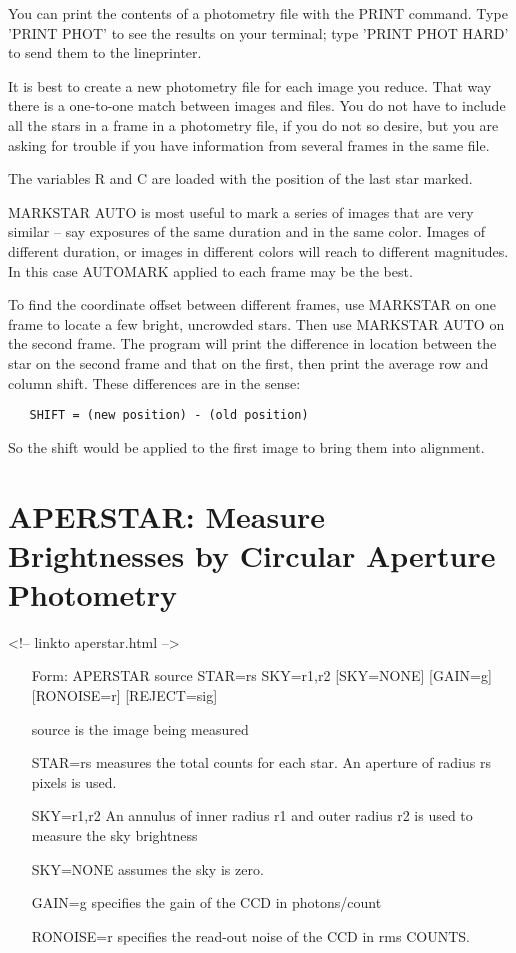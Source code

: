 You can print the contents of a photometry file with the PRINT command.
Type 'PRINT PHOT' to see the results on your terminal; type 'PRINT PHOT
HARD' to send them to the lineprinter.

It is best to create a new photometry file for each image you reduce.  That
way there is a one-to-one match between images and files.  You do not have
to include all the stars in a frame in a photometry file, if you do not so
desire, but you are asking for trouble if you have information from several
frames in the same file.

The variables R and C are loaded with the position of the last star marked.

MARKSTAR AUTO is most useful to mark a series of images that are very
similar -- say exposures of the same duration and in the same color.
Images of different duration, or images in different colors will reach to
different magnitudes.  In this case AUTOMARK applied to each frame may be
the best.

To find the coordinate offset between different frames, use MARKSTAR on one
frame to locate a few bright, uncrowded stars.  Then use MARKSTAR AUTO on
the second frame.  The program will print the difference in location
between the star on the second frame and that on the first, then print the
average row and column shift.  These differences are in the sense: 
\begin{verbatim}
   SHIFT = (new position) - (old position)
\end{verbatim}
So the shift would be applied to the first image to bring them into
alignment.

\section{APERSTAR: Measure Brightnesses by Circular Aperture Photometry}
\begin{rawhtml}
<!-- linkto aperstar.html -->
\end{rawhtml}
\begin{itemize}
  \item[Form: APERSTAR source STAR=rs SKY=r1,r2 {[SKY=NONE]} {[GAIN=g]} {[RONOISE=r]} {[REJECT=sig]}\hfill]{}
  \item[source]{is the image being measured}
  \item[STAR=rs]{measures the total counts for each star.
An aperture of radius rs pixels is used.}
  \item[SKY=r1,r2]{An annulus of inner radius r1 and outer
radius r2 is used to measure the sky brightness}
  \item[SKY=NONE]{assumes the sky is zero.}
  \item[GAIN=g]{specifies the gain of the CCD in photons/count}
  \item[RONOISE=r]{specifies the read-out noise of the CCD in rms COUNTS.}
\end{itemize}

